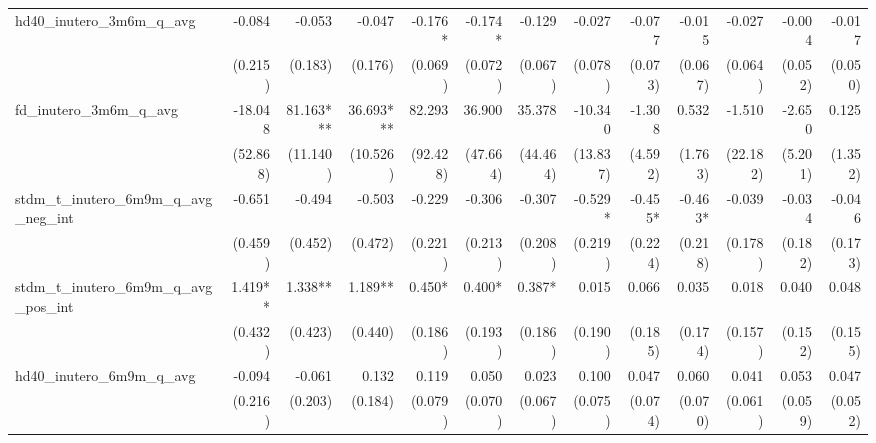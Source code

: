 \begin{tabular}{lrrrrrrrrrrrr}
hd40\_inutero\_3m6m\_q\_avg                 &       -0.084 &       -0.053 &       -0.047 &      -0.176* &      -0.174* &       -0.129 &       -0.027 &       -0.077 &       -0.015 &       -0.027 &       -0.004 &       -0.017 \\ 
                                            &      (0.215) &      (0.183) &      (0.176) &      (0.069) &      (0.072) &      (0.067) &      (0.078) &      (0.073) &      (0.067) &      (0.064) &      (0.052) &      (0.050) \\ 
fd\_inutero\_3m6m\_q\_avg                   &      -18.048 &    81.163*** &    36.693*** &       82.293 &       36.900 &       35.378 &      -10.340 &       -1.308 &        0.532 &       -1.510 &       -2.650 &        0.125 \\ 
                                            &     (52.868) &     (11.140) &     (10.526) &     (92.428) &     (47.664) &     (44.464) &     (13.837) &      (4.592) &      (1.763) &     (22.182) &      (5.201) &      (1.352) \\ 
stdm\_t\_inutero\_6m9m\_q\_avg\_neg\_int    &       -0.651 &       -0.494 &       -0.503 &       -0.229 &       -0.306 &       -0.307 &      -0.529* &      -0.455* &      -0.463* &       -0.039 &       -0.034 &       -0.046 \\ 
                                            &      (0.459) &      (0.452) &      (0.472) &      (0.221) &      (0.213) &      (0.208) &      (0.219) &      (0.224) &      (0.218) &      (0.178) &      (0.182) &      (0.173) \\ 
stdm\_t\_inutero\_6m9m\_q\_avg\_pos\_int    &      1.419** &      1.338** &      1.189** &       0.450* &       0.400* &       0.387* &        0.015 &        0.066 &        0.035 &        0.018 &        0.040 &        0.048 \\ 
                                            &      (0.432) &      (0.423) &      (0.440) &      (0.186) &      (0.193) &      (0.186) &      (0.190) &      (0.185) &      (0.174) &      (0.157) &      (0.152) &      (0.155) \\ 
hd40\_inutero\_6m9m\_q\_avg                 &       -0.094 &       -0.061 &        0.132 &        0.119 &        0.050 &        0.023 &        0.100 &        0.047 &        0.060 &        0.041 &        0.053 &        0.047 \\ 
                                            &      (0.216) &      (0.203) &      (0.184) &      (0.079) &      (0.070) &      (0.067) &      (0.075) &      (0.074) &      (0.070) &      (0.061) &      (0.059) &      (0.052) \\ 

\end{tabular}
